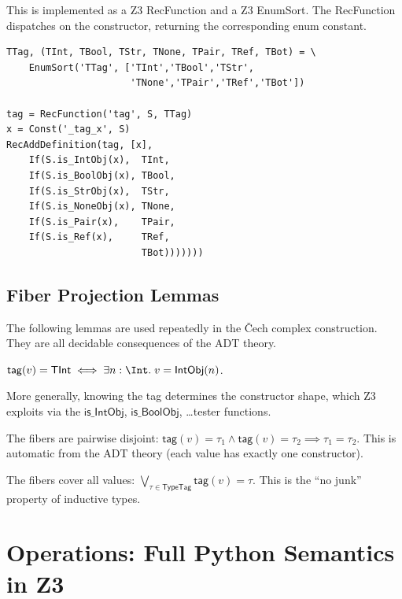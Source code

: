This is implemented as a Z3 RecFunction and a Z3 EnumSort.  The
RecFunction dispatches on the constructor, returning the corresponding
enum constant.

\begin{lstlisting}[caption={TypeTag: complete Z3 implementation}]
TTag, (TInt, TBool, TStr, TNone, TPair, TRef, TBot) = \
    EnumSort('TTag', ['TInt','TBool','TStr',
                      'TNone','TPair','TRef','TBot'])

tag = RecFunction('tag', S, TTag)
x = Const('_tag_x', S)
RecAddDefinition(tag, [x],
    If(S.is_IntObj(x),  TInt,
    If(S.is_BoolObj(x), TBool,
    If(S.is_StrObj(x),  TStr,
    If(S.is_NoneObj(x), TNone,
    If(S.is_Pair(x),    TPair,
    If(S.is_Ref(x),     TRef,
                        TBot)))))))
\end{lstlisting}

\subsection{Fiber Projection Lemmas}

The following lemmas are used repeatedly in the \v{C}ech complex
construction.  They are all decidable consequences of the ADT theory.

\begin{lemma}
\label{lem:fiber-constructor}
$\mathsf{tag}(v) = \mathsf{TInt} \iff \exists n : \Int.\;
v = \mathsf{IntObj}(n)$.

More generally, knowing the tag determines the constructor shape,
which Z3 exploits via the $\mathsf{is\_IntObj}$,
$\mathsf{is\_BoolObj}$, \ldots tester functions.
\end{lemma}

\begin{lemma}
\label{lem:fiber-disjoint}
The fibers are pairwise disjoint: $\mathsf{tag}(v) = \tau_1 \land
\mathsf{tag}(v) = \tau_2 \implies \tau_1 = \tau_2$.
This is automatic from the ADT theory (each value has exactly one
constructor).
\end{lemma}

\begin{lemma}
The fibers cover all values: $\bigvee_{\tau \in \mathsf{TypeTag}}
\mathsf{tag}(v) = \tau$.  This is the ``no junk'' property of
inductive types.
\end{lemma}


\section{Operations: Full Python Semantics in Z3}

